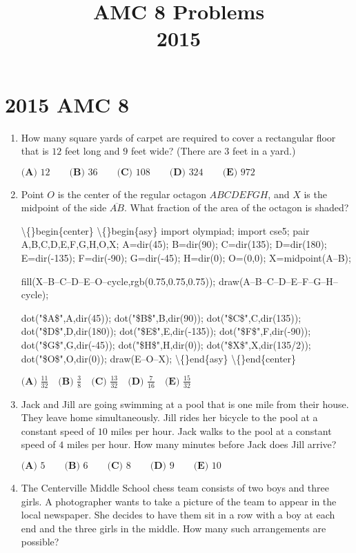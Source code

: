 \documentclass{article}
\title{AMC 8 Problems \\ 2015}
\date{}
\begin{document}
\maketitle\thispagestyle{fancy}\newpage\section*{2015 AMC 8}\begin{enumerate}[label=\arabic*., itemsep=0.5em]\item How many square yards of carpet are required to cover a rectangular floor that is \(12\) feet long and \(9\) feet wide? (There are \(3\) feet in a yard.)

\(\textbf{(A) }12\qquad\textbf{(B) }36\qquad\textbf{(C) }108\qquad\textbf{(D) }324\qquad \textbf{(E) }972\)\par \vspace{0.5em}\item Point \(O\) is the center of the regular octagon \(ABCDEFGH\), and \(X\) is the midpoint of the side \(\overline{AB}.\) What fraction of the area of the octagon is shaded?


\textbackslash\{\}begin\{center\}
\textbackslash\{\}begin\{asy\}
import olympiad;
import cse5;
pair A,B,C,D,E,F,G,H,O,X;
A=dir(45);
B=dir(90);
C=dir(135);
D=dir(180);
E=dir(-135);
F=dir(-90);
G=dir(-45);
H=dir(0);
O=(0,0);
X=midpoint(A--B);

fill(X--B--C--D--E--O--cycle,rgb(0.75,0.75,0.75));
draw(A--B--C--D--E--F--G--H--cycle);

dot("\$A\$",A,dir(45));
dot("\$B\$",B,dir(90));
dot("\$C\$",C,dir(135));
dot("\$D\$",D,dir(180));
dot("\$E\$",E,dir(-135));
dot("\$F\$",F,dir(-90));
dot("\$G\$",G,dir(-45));
dot("\$H\$",H,dir(0));
dot("\$X\$",X,dir(135/2));
dot("\$O\$",O,dir(0));
draw(E--O--X);
\textbackslash\{\}end\{asy\}
\textbackslash\{\}end\{center\}


\(\textbf{(A) }\frac{11}{32} \quad\textbf{(B) }\frac{3}{8} \quad\textbf{(C) }\frac{13}{32} \quad\textbf{(D) }\frac{7}{16}\quad \textbf{(E) }\frac{15}{32}\)\par \vspace{0.5em}\item Jack and Jill are going swimming at a pool that is one mile from their house. They leave home simultaneously. Jill rides her bicycle to the pool at a constant speed of \(10\) miles per hour. Jack walks to the pool at a constant speed of \(4\) miles per hour. How many minutes before Jack does Jill arrive?

\(\textbf{(A) }5\qquad\textbf{(B) }6\qquad\textbf{(C) }8\qquad\textbf{(D) }9\qquad \textbf{(E) }10\)\par \vspace{0.5em}\item The Centerville Middle School chess team consists of two boys and three girls. A photographer wants to take a picture of the team to appear in the local newspaper. She decides to have them sit in a row with a boy at each end and the three girls in the middle. How many such arrangements are possible? 


\end{enumerate}
\end{document}
